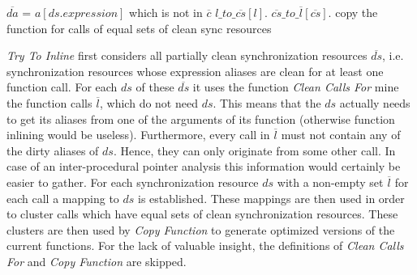 \begin{algorithmic}
\State {}
 
  \State $\overline{da}$ = $a[ds.\mathit{expression}]$ which is not in $\overline{c}$ 
   
    \State $l\_to\_\overline{cs}[l]$. 
  \EndFor
\EndFor
{} 
  \State $\overline{cs}\_to\_\overline{l}[\overline{cs}]$.
\EndFor
{} \Comment copy the function for calls of equal sets of clean sync resources
  \State {}
\EndFor
\EndFunction
\end{algorithmic}
\textit{Try To Inline} first considers all partially clean synchronization resources $\overline{ds}$, i.e. synchronization resources whose expression aliases are clean for at least one function call. For each $ds$ of these $\overline{ds}$ it uses the function \textit{Clean Calls For} mine the function calls $\overline{l}$, which do not need $ds$. This means that the $ds$ actually needs to get its aliases from one of the arguments of its function (otherwise function inlining would be useless). Furthermore, every call in $\overline{l}$ must not contain any of the dirty aliases of $ds$. Hence, they can only originate from some other call. In case of an inter-procedural pointer analysis this information would certainly be easier to gather. For each synchronization resource $ds$ with a non-empty set $\overline{l}$ for each call a mapping to $ds$ is established. These mappings are then used in order to cluster calls which have equal sets of clean synchronization resources. These clusters are then used by \textit{Copy Function} to generate optimized versions of the current functions. For the lack of valuable insight, the definitions of \textit{Clean Calls For} and \textit{Copy Function} are skipped.

